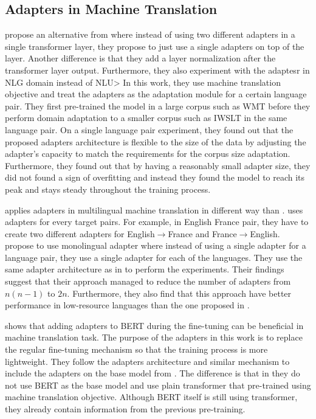 \subsection{Adapters in Machine Translation}
\label{sec:app_mt}
\cite{bapna2019simple} propose an alternative from \cite{houlsby2019parameter} where instead of using two different adapters in a single transformer layer, they propose to just use a single adapters on top of the layer. Another difference is that they add a layer normalization after the transformer layer output. Furthermore, they also experiment with the adaptesr in NLG domain instead of NLU> In this work, they use machine translation objective and treat the adapters as the adaptation module for a certain language pair. They first pre-trained the model in a large corpus such as WMT before they perform domain adaptation to a smaller corpus such as IWSLT in the same language pair. On a single language pair experiment, they found out that the proposed adapters architecture is flexible to the size of the data by adjusting the adapter's capacity to match the requirements for the corpus size adaptation. Furthermore, they found out that by having a reasonably small adapter size, they did not found a sign of overfitting and instead they found the model to reach its peak and stays steady throughout the training process.

\cite{philip2020monolingual} applies adapters in multilingual machine translation in different way than \cite{bapna2019simple}. \cite{bapna2019simple} uses adapters for every target pairs. For example, in English France pair, they have to create two different adapters for English$\rightarrow$France and France$\rightarrow$English. \cite{philip2020monolingual} propose to use monolingual adapter where instead of using a single adapter for a language pair, they use a single adapter for each of the languages. They use the same adapter architecture as in \cite{bapna2019simple} to perform the experiments. Their findings suggest that their approach managed to reduce the number of adapters from $n(n-1)$ to $2n$. Furthermore, they also find that this approach have better performance in low-resource languages than the one proposed in \cite{bapna2019simple}.

\cite{guo2021adaptive} shows that adding adapters to BERT during the fine-tuning can be beneficial in machine translation task. The purpose of the adapters in this work is to replace the regular fine-tuning mechanism so that the training process is more lightweight. They follow the adapters architecture and similar mechanism to include the adapters on the base model from \cite{bapna2019simple}. The difference is that in \cite{bapna2019simple} they do not use BERT as the base model and use plain transformer that pre-trained using machine translation objective. Although BERT itself is still using transformer, they already contain information from the previous pre-training.


